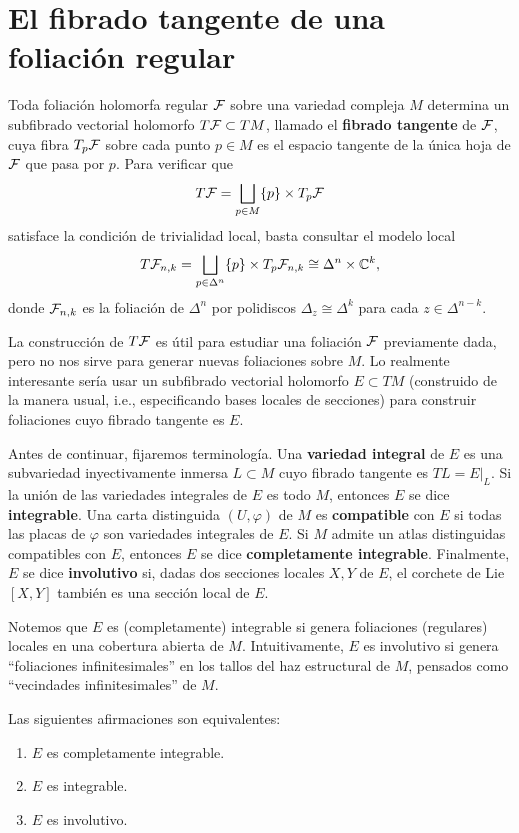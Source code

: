 \section{El fibrado tangente de una foliación regular}

Toda foliación holomorfa regular $\mathcal F$ sobre una variedad compleja $M$ determina un subfibrado vectorial holomorfo $T\mathcal F \subset TM$, llamado el \textbf{fibrado tangente} de $\mathcal F$, cuya fibra $T_p \mathcal F$ sobre cada punto $p \in M$ es el espacio tangente de la única hoja de $\mathcal F$ que pasa por $p$. Para verificar que
$$T\mathcal F = \bigsqcup_{p \in M} \{ p \} \times T_p\mathcal F$$
satisface la condición de trivialidad local, basta consultar el modelo local
$$T\mathcal F_{n,k} = \bigsqcup_{p \in \Delta^n} \{ p \} \times T_p \mathcal F_{n,k} \cong \Delta^n \times \mathbb C^k,$$
donde $\mathcal F_{n,k}$ es la foliación de $\Delta^n$ por polidiscos $\Delta_z \cong \Delta^k$ para cada $z \in \Delta^{n-k}$.

La construcción de $T\mathcal F$ es útil para estudiar una foliación $\mathcal F$ previamente dada, pero no nos sirve para generar nuevas foliaciones sobre $M$. Lo realmente interesante sería usar un subfibrado vectorial holomorfo $E \subset TM$ (construido de la manera usual, i.e., especificando bases locales de secciones) para construir foliaciones cuyo fibrado tangente es $E$.

Antes de continuar, fijaremos terminología. Una \textbf{variedad integral} de $E$ es una subvariedad inyectivamente inmersa $L \subset M$ cuyo fibrado tangente es $TL = E \vert_L$. Si la unión de las variedades integrales de $E$ es todo $M$, entonces $E$ se dice \textbf{integrable}. Una carta distinguida $(U, \varphi)$ de $M$ es \textbf{compatible} con $E$ si todas las placas de $\varphi$ son variedades integrales de $E$. Si $M$ admite un atlas distinguidas compatibles con $E$, entonces $E$ se dice \textbf{completamente integrable}. Finalmente, $E$ se dice \textbf{involutivo} si, dadas dos secciones locales $X, Y$ de $E$, el corchete de Lie $[X,Y]$ también es una sección local de $E$.

Notemos que $E$ es (completamente) integrable si genera foliaciones (regulares) locales en una cobertura abierta de $M$. Intuitivamente, $E$ es involutivo si genera ``foliaciones infinitesimales'' en los tallos del haz estructural de $M$, pensados como ``vecindades infinitesimales'' de $M$.

\begin{theorem}
Las siguientes afirmaciones son equivalentes:
\begin{enumerate}[label=\alph*)]
    \itemsep 0em
    \item $E$ es completamente integrable.
    \item $E$ es integrable.
    \item $E$ es involutivo.
\end{enumerate}
\end{theorem}

